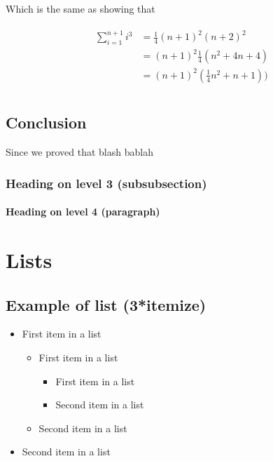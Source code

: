 \documentclass[paper=a4, fontsize=11pt]{scrartcl} %
\numberwithin{equation}{section} %
\numberwithin{figure}{section} %
\numberwithin{table}{section} %
\begin{document}
Which is the same as showing that

\begin{align} 
\begin{split}
\sum_{i=1}^{n+1} i^3 	&= \frac{1}{4}(n+1)^2(n+2)^2\\
&= (n+1)^2\frac{1}{4}(n^2+4n+4) \\
&=(n+1)^2(\frac{1}{4}n^2+n+1))\\
\end{split}	
\end{align}
\subsection{Conclusion}

Since we proved that blash bablah 

\subsubsection{Heading on level 3 (subsubsection)}

\lipsum[3] %

\paragraph{Heading on level 4 (paragraph)}

\lipsum[6] %


\section{Lists}


\subsection{Example of list (3*itemize)}
\begin{itemize}
	\item First item in a list 
		\begin{itemize}
		\item First item in a list 
			\begin{itemize}
			\item First item in a list 
			\item Second item in a list 
			\end{itemize}
		\item Second item in a list 
		\end{itemize}
	\item Second item in a list 
\end{itemize}
\end{document}
